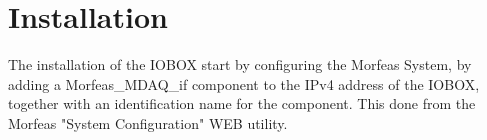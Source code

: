\section{Installation}
The installation of the IOBOX start by configuring the Morfeas System, by adding a Morfeas\_MDAQ\_if component to the IPv4 address of the IOBOX,
together with an identification name for the component.
This done from the Morfeas "System Configuration" WEB utility.